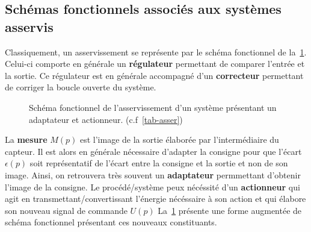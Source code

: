 \subsection{Schémas fonctionnels associés aux systèmes asservis}
Classiquement, un asservissement se représente par le schéma fonctionnel de 
la~\cref{fig-reg2}. Celui-ci comporte en générale un \textbf{régulateur}
permettant de comparer l'entrée et la sortie. Ce régulateur est en 
générale accompagné d'un \textbf{correcteur}
permettant de corriger la boucle ouverte du système.
\begin{figure}[!h]
    \centering
    
    \caption{Schéma fonctionnel de l'asservissement d'un système 
             présentant un adaptateur et actionneur. (c.f~\cref{tab-asser})
             \label{fig-reg2}}
\end{figure}
%    
La \textbf{mesure} $M(p)$ est l'image de la sortie élaborée par 
l'intermédiaire du capteur. Il est alors en générale nécessaire d'adapter 
la consigne pour que l'écart $\epsilon(p)$ soit représentatif de l'écart 
entre la consigne et la sortie et non de son image. Ainsi, on retrouvera 
très souvent un \textbf{adaptateur} permmettant d'obtenir l'image 
de la consigne. Le procédé/système peux nécéssité d'un \textbf{actionneur} qui 
agit en transmettant/convertissant l'énergie nécéssaire à son action et qui
élabore son nouveau signal de commande $U(p)$
La~\cref{fig-reg2} présente une forme augmentée de schéma fonctionnel
présentant ces nouveaux constituants. 
